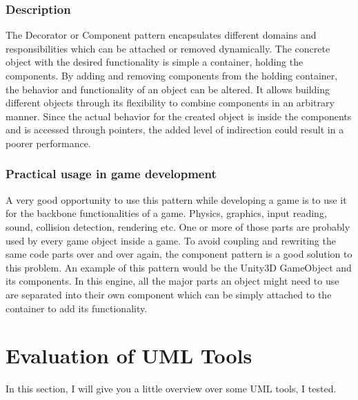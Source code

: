 \subsubsection{Description}
The Decorator or Component pattern encapsulates different domains and responsibilities which can be attached or removed dynamically. The concrete object with the desired functionality is simple a container, holding the components. By adding and removing components from the holding container, the behavior and functionality of an object can be altered. It allows building different objects through its flexibility to combine components in an arbitrary manner. Since the actual behavior for the created object is inside the components and is accessed through pointers, the added level of indirection could result in a poorer performance.  

\subsubsection{Practical usage in game development}
A very good opportunity to use this pattern while developing a game is to use it for the backbone functionalities of a game. Physics, graphics, input reading, sound, collision detection, rendering etc. One or more of those parts are probably used by every game object inside a game. To avoid coupling and rewriting the same code parts over and over again, the component pattern is a good solution to this problem. An example of this pattern would be the Unity3D  GameObject and its components. In this engine, all the major parts an object might need to use are separated into their own component which can be simply attached to the container to add its functionality. 




\vfill

\pagebreak
\section{Evaluation of UML Tools}
In this section, I will give you a little overview over some UML tools, I tested. 
